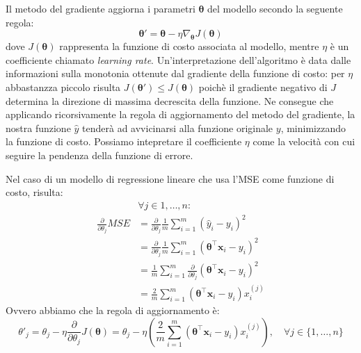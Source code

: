 \documentclass{standalone}
\begin{document}
Il metodo del gradiente aggiorna i parametri $\bm \theta$ del modello secondo
la seguente regola: 
$$ \bm \theta' = \bm \theta - \eta \nabla_{\bm \theta} J(\bm \theta) $$
dove $J(\bm \theta)$ rappresenta la funzione di costo associata al modello,
mentre $\eta$ è un coefficiente chiamato \emph{learning rate}.
Un'interpretazione dell'algoritmo è data dalle informazioni sulla monotonia
ottenute dal gradiente della funzione di costo: per $\eta$ abbastanzza piccolo
risulta $J(\bm \theta') \leq J(\bm \theta)$ poichè il gradiente negativo di $J$
determina la direzione di massima decrescita della funzione\cite{goodfellow}.
Ne consegue che applicando ricorsivamente la regola di aggiornamento del metodo
del gradiente, la nostra funzione $\hat{y}$ tenderà ad avvicinarsi alla
funzione originale $y$, minimizzando la funzione di costo.
Possiamo intepretare il coefficiente $\eta$ come la velocità con cui seguire la
pendenza della funzione di errore.

Nel caso di un modello di regressione lineare che usa l'MSE come funzione di
costo, risulta: 
\begin{align*}
  &\forall j \in {1, \dotsc, n}: \\
  \frac{\partial}{\partial\theta_j} MSE
  &= 
  \frac{\partial}{\partial\theta_j} \frac{1}{m} \sum_{i=1}^m{(\hat{y}_i -
    y_i)^2} \\ 
  &= \frac{\partial}{\partial\theta_j} \frac{1}{m}
  \sum_{i=1}^m{(\bm \theta^\intercal \bm x_i - y_i)^2} \\
  &= \frac{1}{m}
  \sum_{i=1}^m{\frac{\partial}{\partial\theta_j}(\bm \theta^\intercal \bm x_i -
    y_i)^2} \\
  &= \frac{2}{m}
  \sum_{i=1}^m{(\bm \theta^\intercal \bm x_i - y_i)x_i^{(j)}}
\end{align*}
%
Ovvero abbiamo che la regola di aggiornamento è:
$$ \theta'_j = \theta_j - \eta \frac{\partial}{\partial\theta_j} J(\bm \theta)
             = \theta_j - \eta (\frac{2}{m} 
             \sum_{i=1}^m{(\bm \theta^\intercal \bm x_i - y_i)x_i^{(j)}}),
             \quad \forall j \in \{1, \dotsc, n\}
$$


\end{document}
